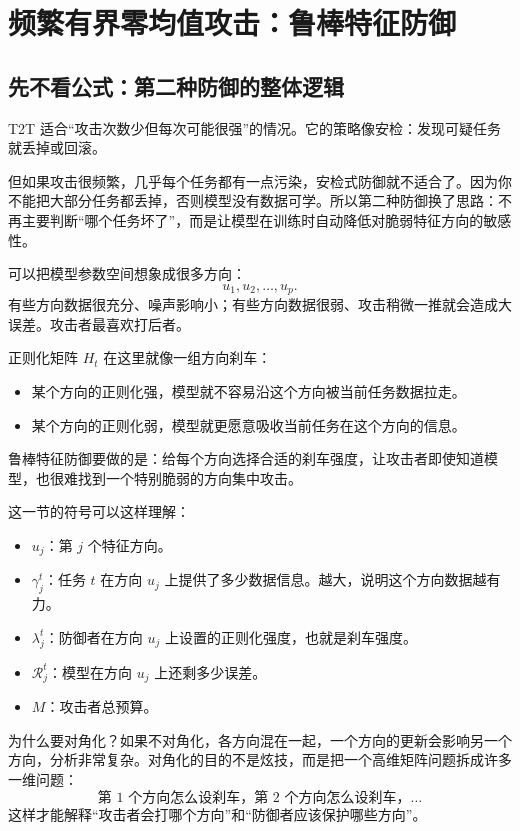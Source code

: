 \documentclass[UTF8,fontset=none,11pt]{ctexart}
\theoremstyle{cnstyle}
\newcommand{\calR}{\mathcal{R}}
\begin{document}
\section{频繁有界零均值攻击：鲁棒特征防御}

\subsection{先不看公式：第二种防御的整体逻辑}

T2T 适合“攻击次数少但每次可能很强”的情况。它的策略像安检：发现可疑任务就丢掉或回滚。

但如果攻击很频繁，几乎每个任务都有一点污染，安检式防御就不适合了。因为你不能把大部分任务都丢掉，否则模型没有数据可学。所以第二种防御换了思路：不再主要判断“哪个任务坏了”，而是让模型在训练时自动降低对脆弱特征方向的敏感性。

可以把模型参数空间想象成很多方向：
\[
  u_1,u_2,\dots,u_p.
\]
有些方向数据很充分、噪声影响小；有些方向数据很弱、攻击稍微一推就会造成大误差。攻击者最喜欢打后者。

正则化矩阵 \(H_t\) 在这里就像一组方向刹车：
\begin{itemize}
  \item 某个方向的正则化强，模型就不容易沿这个方向被当前任务数据拉走。
  \item 某个方向的正则化弱，模型就更愿意吸收当前任务在这个方向的信息。
\end{itemize}
鲁棒特征防御要做的是：给每个方向选择合适的刹车强度，让攻击者即使知道模型，也很难找到一个特别脆弱的方向集中攻击。

这一节的符号可以这样理解：
\begin{itemize}
  \item \(u_j\)：第 \(j\) 个特征方向。
  \item \(\gamma_j^t\)：任务 \(t\) 在方向 \(u_j\) 上提供了多少数据信息。越大，说明这个方向数据越有力。
  \item \(\lambda_j^t\)：防御者在方向 \(u_j\) 上设置的正则化强度，也就是刹车强度。
  \item \(\calR_j^t\)：模型在方向 \(u_j\) 上还剩多少误差。
  \item \(M\)：攻击者总预算。
\end{itemize}

为什么要对角化？如果不对角化，各方向混在一起，一个方向的更新会影响另一个方向，分析非常复杂。对角化的目的不是炫技，而是把一个高维矩阵问题拆成许多一维问题：
\[
  \text{第 }1\text{ 个方向怎么设刹车，}
  \text{第 }2\text{ 个方向怎么设刹车，}\dots
\]
这样才能解释“攻击者会打哪个方向”和“防御者应该保护哪些方向”。
\end{document}
